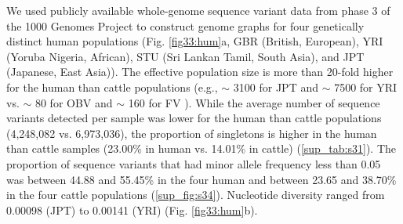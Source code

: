 \documentclass[../main.tex]{subfiles}
\begin{document}
We used publicly available whole-genome sequence variant data from phase 3 of the 1000 Genomes Project \citep{10002015global} to construct genome graphs for four genetically distinct human populations (Fig. \ref{fig33:hum}a, GBR (British, European), YRI (Yoruba Nigeria, African), STU (Sri Lankan Tamil, South Asia), and JPT (Japanese, East Asia)). The effective population size is more than 20-fold higher for the human than cattle populations (e.g., $\sim$ 3100 for JPT and $\sim$ 7500 for YRI \citep{tenesa2007recent} vs. $\sim$ 80 for OBV and $\sim$ 160 for FV \citep{pausch2013imputation,hagger2005estimates}). While the average number of sequence variants detected per sample was lower for the human than cattle populations (4,248,082 vs. 6,973,036), the proportion of singletons is higher in the human than cattle samples (23.00\% in human vs. 14.01\% in cattle) (\ref{sup_tab:s31}). The proportion of sequence variants that had minor allele frequency less than 0.05 was between 44.88 and 55.45\% in the four human and between 23.65 and 38.70\% in the four cattle populations (\ref{sup_fig:s34}). Nucleotide diversity ranged from 0.00098 (JPT) to 0.00141 (YRI) (Fig. \ref{fig33:hum}b).
\end{document}
